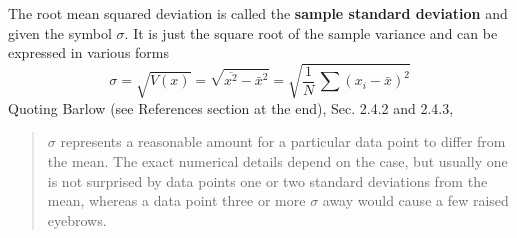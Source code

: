 \documentclass[12pt]{article}
\begin{document}
\noindent The root mean squared deviation is called the \textbf{sample standard deviation} and given
   the symbol $\sigma$.
It is just the square root of the sample variance and can be expressed in various forms
\begin{equation}  \label{eq:mv4}
 \sigma = \sqrt{V(x)} = \sqrt{\overline{x^2} - \bar{x}^2} = \sqrt{\frac{1}{N}\,\sum (x_i - \bar{x})^2}
\end{equation}
Quoting Barlow (see References section at the end), Sec. 2.4.2 and 2.4.3,
\begin{quote}
$\sigma$ represents a reasonable amount for a particular data point to differ from the mean.
The exact numerical details depend on the case, but usually one is not surprised by data points
   one or two standard deviations from the mean, whereas a data point three or more
   $\sigma$   away would cause a few raised eyebrows.\\


\end{quote}
\end{document}
